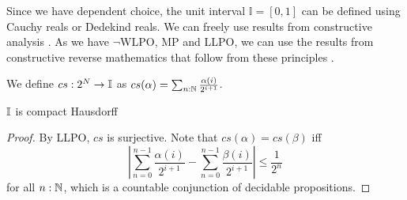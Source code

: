 Since we have dependent choice, the unit interval $\mathbb I = [0,1]$ can be defined using 
Cauchy reals or Dedekind reals. 
We can freely use results from constructive analysis \cite{Bishop}. 
As we have $\neg$WLPO, MP and LLPO, we can use the results from 
constructive reverse mathematics that follow from these principles \cite{ReverseMathsBishop, HannesDiener}. 
\begin{definition}
  We define $cs:2^N \to \mathbb{I}$ as 
  $cs(\alpha) = \sum_{n:\mathbb{N}} \frac{\alpha(i)}{2^{i+1}}$. 
\end{definition}

\begin{theorem}
  $\mathbb{I}$ is compact Hausdorff
\end{theorem}
\begin{proof}
  By LLPO, $cs$ is surjective.   
  Note that $cs(\alpha) = cs(\beta)$ iff 
  $$\left|\sum_{n=0}^{n-1} \frac{\alpha(i)}{2^{i+1}}-
  \sum_{n=0}^{n-1} \frac{\beta(i)}{2^{i+1}}\right|\leq \frac{1}{2^n}$$
  for all $n:\mathbb{N}$, which is a countable conjunction of decidable propositions.
\end{proof}

